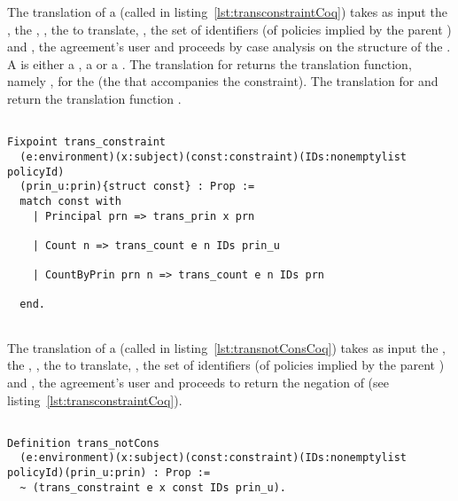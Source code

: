 The translation of a  (called  in listing~\ref{lst:transconstraintCoq}) takes as input  the ,  the , , the  to translate, , the set of identifiers (of policies implied by the parent ) and , the agreement's user and proceeds by case analysis on the structure of the . A  is either a , a  or a . The translation for  returns the translation function, namely , for the  (the  that accompanies the  constraint). The translation for  and  return the translation function . 


\begin{minipage}[c]{0.95\textwidth}
\begin{lstlisting}

Fixpoint trans_constraint 
  (e:environment)(x:subject)(const:constraint)(IDs:nonemptylist policyId)
  (prin_u:prin){struct const} : Prop := 
  match const with
    | Principal prn => trans_prin x prn
  
    | Count n => trans_count e n IDs prin_u

    | CountByPrin prn n => trans_count e n IDs prn 

  end.
  
\end{lstlisting}
\end{minipage}

The translation of a  (called  in listing~\ref{lst:transnotConsCoq}) takes as input  the ,  the , , the  to translate, , the set of identifiers (of policies implied by the parent ) and , the agreement's user and proceeds to return the negation of  (see listing~\ref{lst:transconstraintCoq}).

\begin{lstlisting}

Definition trans_notCons
  (e:environment)(x:subject)(const:constraint)(IDs:nonemptylist policyId)(prin_u:prin) : Prop :=
  ~ (trans_constraint e x const IDs prin_u).
\end{lstlisting}


